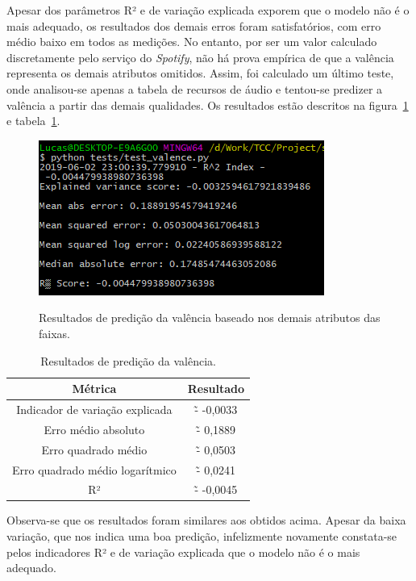 Apesar dos parâmetros R² e de variação explicada exporem que o modelo não é o mais adequado, os resultados dos demais erros foram satisfatórios, com erro médio baixo em todos as medições. No entanto, por ser um valor calculado discretamente pelo serviço do \textit{Spotify}, não há prova empírica de que a valência representa os demais atributos omitidos. Assim, foi calculado um último teste, onde analisou-se apenas a tabela de recursos de áudio e tentou-se predizer a valência a partir das demais qualidades. Os resultados estão descritos na figura~\ref{f.test_valence_results} e tabela~\ref{t.test_valence_results}.

\begin{figure}[H]
\caption{Resultados de predição da valência baseado nos demais atributos das faixas.}
\centering
\includegraphics[width=\textwidth,height=\textheight,keepaspectratio]{../figs/test_valence_results.PNG}
\label{f.test_valence_results}
\end{figure}

\begin{table}[H]
\centering
\begin{tabular}{c|c}
\hline
\textbf{Métrica} & \textbf{Resultado}\\\hline \hline
{Indicador de variação explicada} & {\~- -0,0033}\\\hline
{Erro médio absoluto} & {\~- 0,1889}\\\hline
{Erro quadrado médio} & {\~- 0,0503}\\\hline
{Erro quadrado médio logarítmico} & {\~- 0,0241}\\\hline
{R²} & {\~- -0,0045}\\\hline
\end{tabular}
\caption{Resultados de predição da valência.}\label{t.test_valence_results}
\end{table}

Observa-se que os resultados foram similares aos obtidos acima. Apesar da baixa variação, que nos indica uma boa predição, infelizmente novamente constata-se pelos indicadores R² e de variação explicada que o modelo não é o mais adequado.